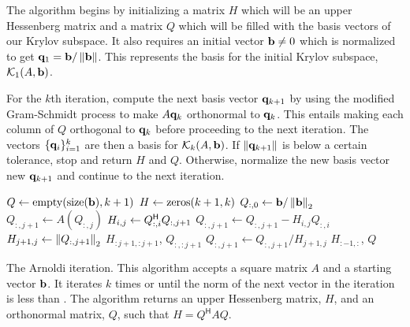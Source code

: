 The algorithm begins by initializing a matrix $H$ which will be an upper Hessenberg matrix and a matrix $Q$ which will be filled with the basis vectors of our Krylov subspace.
It also requires an initial vector $\mathbf{b} \neq 0$ which is normalized to get $\mathbf{q}_1 = \mathbf{b}/\left\lVert\mathbf{b}\right\rVert$.
This represents the basis for the initial Krylov subspace, $\mathcal{K}_1(A,\mathbf{b})$.

For the $k$th iteration, compute the next basis vector $\mathbf{q}_{k+1}$ by using the modified Gram-Schmidt process to make $A\mathbf{q}_k$ orthonormal to $\mathbf{q}_k$.
This entails making each column of $Q$ orthogonal to $\mathbf{q}_k$ before proceeding to the next iteration.
The vectors $\{\mathbf{q}_i\}_{i=1}^k$ are then a basis for $\mathcal{K}_k(A,\mathbf{b})$.
If $\left\lVert\mathbf{q}_{k+1}\right\rVert$ is below a certain tolerance, stop and return $H$ and $Q$.
Otherwise, normalize the new basis vector new $\mathbf{q}_{k+1}$ and continue to the next iteration.


\begin{algorithm}
\begin{algorithmic}[1]
	\State $Q \gets \allocate{\size{\b}}{k+1}$			
	\State $H \gets \zeros{ k+1}{ k}$
	\State $Q_{:,0} \gets \mathbf{b}/\left\lVert\mathbf{b}\right\rVert_2$
								
		\State $Q_{:,j+1} \gets A(Q_{:,j})$
							
			\State $H_{i,j} \gets Q_{:,i}^{\mathsf H} Q_{:,j+1}$
			\State $Q_{:,j+1} \gets Q_{:,j+1} - H_{i,j} Q_{:,i}$
		\EndFor
		\State $H_{j+1,j} \gets \left\lVert Q_{:,j+1}\right\rVert_2$			
            					
			\State {} $H_{:j+1,:j+1}$, $Q_{:,:j+1}$
		\EndIf
		\State $Q_{:,j+1} \gets Q_{:,j+1}/H_{j+1,j}$				
	\EndFor
	\State {} $H_{:-1, :}$, $Q$			
\EndProcedure
\end{algorithmic}
\caption{The Arnoldi iteration.
This algorithm accepts a square matrix $A$ and a starting vector $\mathbf{b}$.
It iterates $k$ times or until the norm of the next vector in the iteration is less than .
The algorithm returns an upper Hessenberg matrix, $H$, and an orthonormal matrix, $Q$, such that $H = Q^{\mathsf{H}}AQ$.}
\label{alg:arnoldi_iteration}
\end{algorithm}

